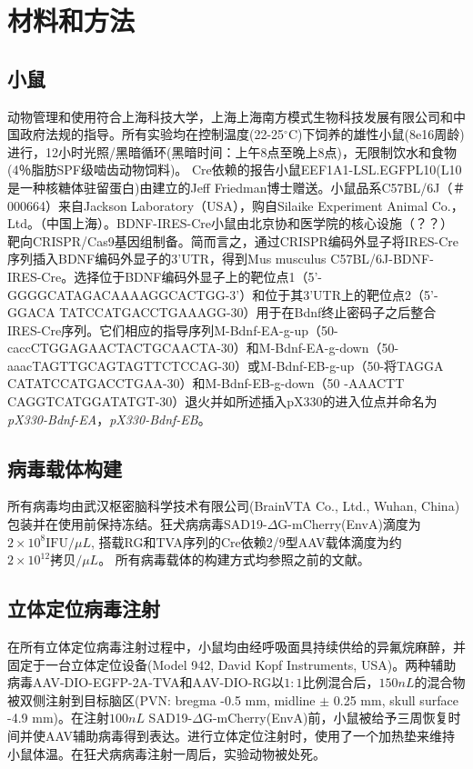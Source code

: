 \chapter{材料和方法}

\section{小鼠}
动物管理和使用符合上海科技大学，上海上海南方模式生物科技发展有限公司和中国政府法规的指导。所有实验均在控制温度(22-25$^\circ$C)下饲养的雄性小鼠(8e16周龄)进行，12小时光照/黑暗循环(黑暗时间：上午8点至晚上8点)，无限制饮水和食物(4％脂肪SPF级啮齿动物饲料)。
Cre依赖的报告小鼠EEF1A1-LSL.EGFPL10(L10是一种核糖体驻留蛋白)由建立\citep{stanley2013profiling}的Jeff Friedman博士赠送。小鼠品系C57BL/6J（＃000664）来自Jackson Laboratory（USA），购自Silaike Experiment Animal Co.，Ltd。（中国上海）。BDNF-IRES-Cre小鼠由北京协和医学院的核心设施（？？）靶向CRISPR/Cas9基因组制备。简而言之，通过CRISPR编码外显子将IRES-Cre序列插入BDNF编码外显子的3'UTR，得到Mus musculus C57BL/6J-BDNF-IRES-Cre。选择位于BDNF编码外显子上的靶位点1（5'-GGGGCATAGACAAAAGGCACTGG-3'）和位于其3'UTR上的靶位点2（5'-GGACA TATCCATGACCTGAAAGG-30）用于在Bdnf终止密码子之后整合IRES-Cre序列。它们相应的指导序列M-Bdnf-EA-g-up（50-caccCTGGAGAACTACTGCAACTA-30）和M-Bdnf-EA-g-down（50-aaacTAGTTGCAGTAGTTCTCCAG-30）或M-Bdnf-EB-g-up（50-将TAGGA CATATCCATGACCTGAA-30）和M-Bdnf-EB-g-down（50 -AAACTT CAGGTCATGGATATGT-30）退火并如\citep{mizuno2014simple}所述插入pX330的进入位点并命名为\textit{pX330-Bdnf-EA}，\textit{pX330-Bdnf-EB}。

\section{病毒载体构建}
所有病毒均由武汉枢密脑科学技术有限公司(BrainVTA Co., Ltd., Wuhan, China)包装并在使用前保持冻结。狂犬病病毒SAD19-$\Delta$G-mCherry(EnvA)滴度为$2 \times 10^8 \text{IFU}/\mu L$, 搭载RG和TVA序列的Cre依赖2/9型AAV载体滴度为约$2 \times 10^12 \text{拷贝}/\mu L$。 所有病毒载体的构建方式均参照之前的文献\citep{zhang2017whole}。

\section{立体定位病毒注射}
在所有立体定位病毒注射过程中，小鼠均由经呼吸面具持续供给的异氟烷麻醉，并固定于一台立体定位设备(Model 942, David Kopf Instruments, USA)。两种辅助病毒AAV-DIO-EGFP-2A-TVA和AAV-DIO-RG以$1:1$比例混合后，$150nL$的混合物被双侧注射到目标脑区(PVN: bregma -0.5 mm, midline $\pm$ 0.25 mm, skull surface -4.9 mm)。在注射$100 nL$ SAD19-$\Delta$G-mCherry(EnvA)前，小鼠被给予三周恢复时间并使AAV辅助病毒得到表达。进行立体定位注射时，使用了一个加热垫来维持小鼠体温。在狂犬病病毒注射一周后，实验动物被处死。

